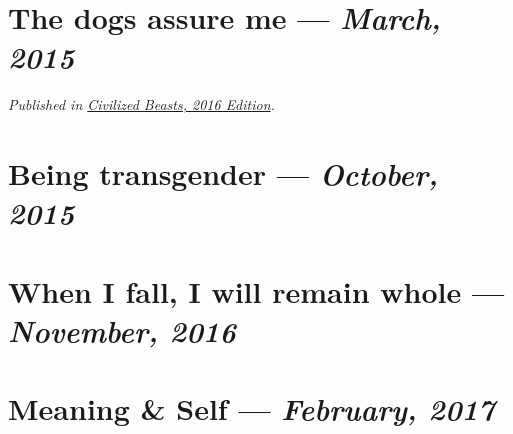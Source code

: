 \documentclass[10pt]{memoir}
\begin{document}

  \section{The dogs assure me --- \textit{March, 2015}}

  

  \textit{Published in \underline{Civilized Beasts, 2016 Edition}.}
  \cleartoverso


  \section{Being transgender --- \textit{October, 2015}}

  
  \newpage


  \section{When I fall, I will remain whole --- \textit{November, 2016}}

  
  \cleartoverso


  \section{Meaning \& Self --- \textit{February, 2017}}

  
  \newpage
\end{document}
